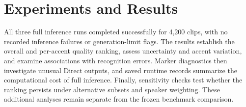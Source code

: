 \section{Experiments and Results}
\label{sec:results}

All three full inference runs completed successfully for 4,200 clips, with no
recorded inference failures or generation-limit flags. The results establish
the overall and per-accent quality ranking, assess uncertainty and accent
variation, and examine associations with recognition errors. Marker diagnostics
then investigate unusual Direct outputs, and saved runtime records summarize
the computational cost of full inference. Finally, sensitivity checks test
whether the ranking persists under alternative subsets and speaker weighting. These
additional analyses remain separate from the frozen benchmark comparison.
